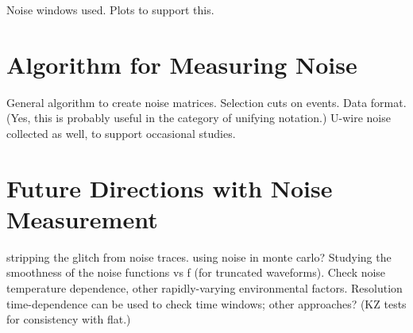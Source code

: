 Noise windows used.
Plots to support this.

\section{Algorithm for Measuring Noise}\label{sec:NoiseCorrelationsImplementation}

General algorithm to create noise matrices.
Selection cuts on events.
Data format.  (Yes, this is probably useful in the category of unifying notation.)
U-wire noise collected as well, to support occasional studies.

\section{Future Directions with Noise Measurement}\label{sec:NoiseCorrelationsFuture}

stripping the glitch from noise traces.
using noise in monte carlo?
Studying the smoothness of the noise functions vs f (for truncated waveforms).
Check noise temperature dependence, other rapidly-varying environmental factors.
Resolution time-dependence can be used to check time windows; other approaches?  (KZ tests for consistency with flat.)
